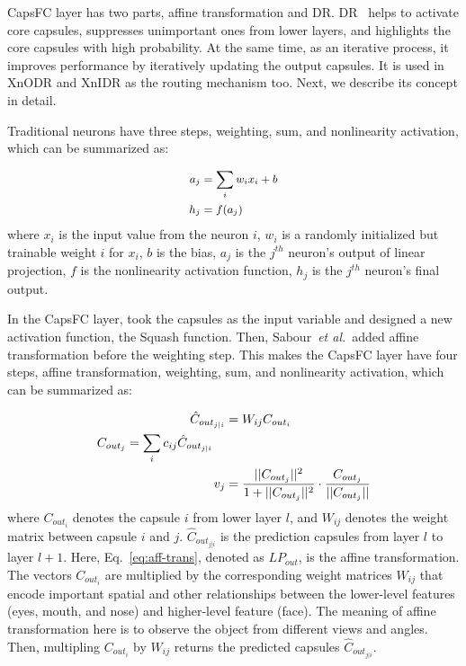 \documentclass[sn-mathphys,iicol,Numbered]{sn-jnl}
\newcommand{\etal}{\textit{et al.}}
\begin{document}
CapsFC layer has two parts, affine transformation and DR. DR~\citep{A1_caps} helps to activate core capsules, suppresses unimportant ones from lower layers, and highlights the core capsules with high probability. At the same time, as an iterative process, it improves performance by iteratively updating the output capsules. It is used in XnODR and XnIDR as the routing mechanism too. Next, we describe its concept in detail.

Traditional neurons have three steps, weighting, sum, and nonlinearity activation, which can be summarized as:

\begin{equation}\small \label{eq:usual-fc}
\begin{split}
a_{j} &= \sum_{i} w_{i}x_{i}+b \\
h_{j} &= f(a_{j})
\end{split}
\end{equation}
where $x_{i}$ is the input value from the neuron $i$, $w_{i}$ is a randomly initialized but trainable weight $i$ for $x_{i}$, $b$ is the bias, $a_{j}$ is the $j^{th}$ neuron's output of linear projection, $f$ is the nonlinearity activation function, $h_{j}$ is the $j^{th}$ neuron's final output.

In the CapsFC layer, \cite{A1_caps} took the capsules as the input variable and designed a new activation function, the Squash function. Then, Sabour~\etal~added affine transformation before the weighting step. This makes the CapsFC layer have four steps, affine transformation, weighting, sum, and nonlinearity activation, which can be summarized as:

\vspace{-0.5cm}
\begin{align}\tiny \label{eq:aff-trans}
\hat{C}_{out_{j|i}} &= W_{ij}C_{out_{i}} \\
\begin{split} \label{eq:wght-sum}
C_{out_{j}} &= \sum_{i}c_{ij}\hat{C}_{out_{j|i}} 
\end{split}\\ \label{eq:squash}
v_{j} &= \frac{||C_{out_{j}}||^{2}}{1+||C_{out_{j}}||^{2}}\cdot \frac{C_{out_{j}}}{||C_{out_{j}}||}
\end{align}
where $C_{out_{i}}$ denotes the capsule $i$ from lower layer $l$, and $W_{ij}$ denotes the weight matrix between capsule $i$ and $j$. $\hat{C}_{out_{j|i}}$ is the prediction capsules from layer $l$ to layer $l+1$. Here, Eq.~\ref{eq:aff-trans}, denoted as $LP_{out}$, is the affine transformation. The vectors $C_{out_{i}}$ are multiplied by the corresponding weight matrices $W_{ij}$ that encode important spatial and other relationships between the lower-level features (eyes, mouth, and nose) and higher-level feature (face). The meaning of affine transformation here is to observe the object from different views and angles. Then, multipling $C_{out_{i}}$ by $W_{ij}$ returns the predicted capsules $\hat{C}_{out_{j|i}}$.
\end{document}

